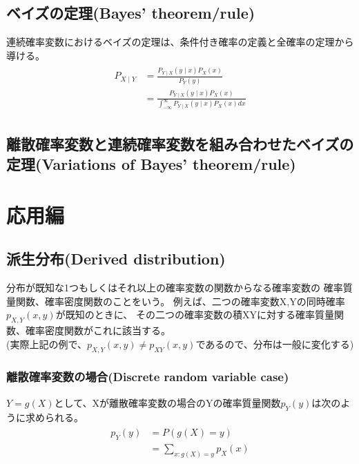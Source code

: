 \documentclass[a4j]{jarticle}
\begin{document}
\subsection{ベイズの定理(Bayes' theorem/rule)}
連続確率変数におけるベイズの定理は、条件付き確率の定義と全確率の定理から導ける。
\begin{align}
    \begin{aligned}
    P_{X \mid Y}&=\frac{P_{Y \mid X}(y \mid x)P_{X}(x)}{P_{Y}(y)} \\
    &=\frac{P_{Y \mid X}(y \mid x)P_{X}(x)}{\int_{-\infty}^{\infty}P_{Y \mid X}(y \mid x)P_{X}(x)dx}
    \end{aligned}
\end{align}


\subsection{離散確率変数と連続確率変数を組み合わせたベイズの定理(Variations of Bayes' theorem/rule)}


\section{応用編}
\subsection{派生分布(Derived distribution)}
分布が既知な1つもしくはそれ以上の確率変数の関数からなる確率変数の
確率質量関数、確率密度関数のことをいう。
例えば、二つの確率変数X,Yの同時確率$p_{X,Y}(x,y)$が既知のときに、
その二つの確率変数の積XYに対する確率質量関数、確率密度関数がこれに該当する。 \\
(実際上記の例で、$p_{X,Y}(x,y) \neq p_{XY}(x,y)$であるので、分布は一般に変化する)

\subsubsection{離散確率変数の場合(Discrete random variable case)}
$Y=g(X)$として、Xが離散確率変数の場合のYの確率質量関数$p_{Y}(y)$は次のように求められる。
\begin{align}
    \begin{aligned}
    p_{Y}(y)&=P(g(X) = y) \\
    &=\sum_{x:g(X)=y}p_{X}(x)
    \end{aligned}
\end{align}
\end{document}
